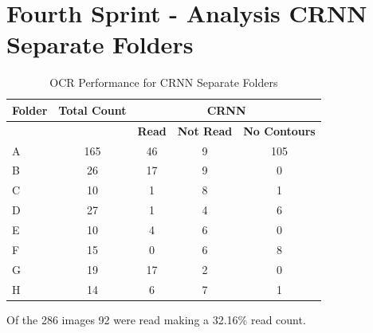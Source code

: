 \newpage

\section{Fourth Sprint - Analysis CRNN Separate Folders}

\begin{table}[h]
    \centering
    \caption{OCR Performance for CRNN Separate Folders}
    \label{tab:fourth_sprint_results}
    \begin{tabular}{|l|c|c|c|c|}
        \hline
        \textbf{Folder} & \textbf{Total Count} & \multicolumn{3}{c|}{\textbf{CRNN}}                                            \\
        \hline
                        &                      & \textbf{Read}                      & \textbf{Not Read} & \textbf{No Contours} \\
        \hline
        A               & 165                  & 46                                 & 9                 & 105                  \\
        B               & 26                   & 17                                 & 9                 & 0                    \\
        C               & 10                   & 1                                  & 8                 & 1                    \\
        D               & 27                   & 1                                  & 4                 & 6                    \\
        E               & 10                   & 4                                  & 6                 & 0                    \\
        F               & 15                   & 0                                  & 6                 & 8                    \\
        G               & 19                   & 17                                 & 2                 & 0                    \\
        H               & 14                   & 6                                  & 7                 & 1                    \\
        \hline
    \end{tabular}
\end{table}
\vspace{1in}
Of the 286 images 92 were read making a 32.16\% read count.
\vspace{1in}
